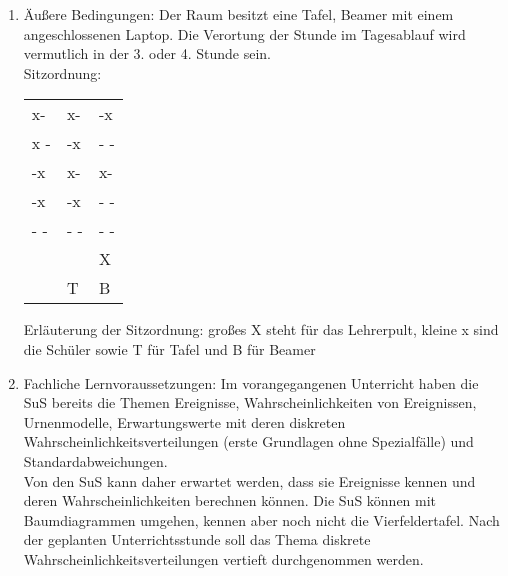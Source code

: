 \documentclass[11pt]{scrartcl}
\begin{document}
\begin{enumerate}
  \item Äußere Bedingungen:
  Der Raum besitzt eine Tafel, Beamer mit einem angeschlossenen Laptop. Die Verortung der Stunde im Tagesablauf wird vermutlich in der 3. oder 4. Stunde sein.\\
Sitzordnung:
    \begin{center}
\begin{tabular}{lll}
 x- & x- & -x\\
x - & -x & - -\\
-x & x- & x-\\
-x & -x & - -\\
- - & - - & - -\\
    &    & X\\
    &  T  & B
    \end{tabular}
    \end{center}
    Erläuterung der Sitzordnung: großes X steht für das Lehrerpult, kleine x sind die Schüler sowie T für Tafel und B für Beamer
  \item Fachliche Lernvoraussetzungen:
  Im vorangegangenen Unterricht haben die SuS bereits die Themen Ereignisse, Wahrscheinlichkeiten von Ereignissen, Urnenmodelle, Erwartungswerte mit deren diskreten Wahrscheinlichkeitsverteilungen (erste Grundlagen ohne Spezialfälle) und Standardabweichungen.\\
  Von den SuS kann daher erwartet werden, dass sie Ereignisse kennen und deren Wahrscheinlichkeiten berechnen können. Die SuS können mit Baumdiagrammen umgehen, kennen aber noch nicht die Vierfeldertafel.
  Nach der geplanten Unterrichtsstunde soll das Thema diskrete Wahrscheinlichkeitsverteilungen vertieft durchgenommen werden.
\end{enumerate}
\end{document}
